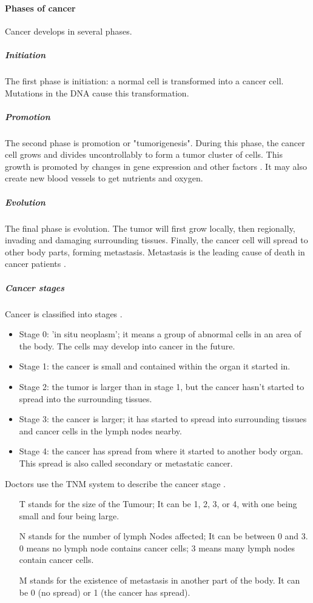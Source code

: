 \paragraph{Phases of cancer}
Cancer develops in several phases.
\subparagraph{Initiation}
The first phase is initiation: a normal cell is transformed into a cancer cell.
Mutations in the DNA cause this transformation.
\subparagraph{Promotion}
The second phase is promotion or "tumorigenesis".
During this phase, the cancer cell grows and divides uncontrollably to form a tumor cluster of cells.
This growth is promoted by changes in gene expression and other factors \cite{Witsch2010}.
It may also create new blood vessels to get nutrients and oxygen.
\subparagraph{Evolution}
The final phase is evolution.
The tumor will first grow locally, then regionally, invading and damaging surrounding tissues.
Finally, the cancer cell will spread to other body parts, forming metastasis.
Metastasis is the leading cause of death in cancer patients \cite{Steeg2006}.

\subparagraph{Cancer stages}
Cancer is classified into stages \cite{cancerresearchuk2023}.
\begin{itemize}
	\item Stage 0: 'in situ neoplasm'; it means a group of abnormal cells in an area of the body. The cells may develop into cancer in the future.
	\item Stage 1: the cancer is small and contained within the organ it started in.
	\item Stage 2: the tumor is larger than in stage 1, but the cancer hasn't started to spread into the surrounding tissues.
	\item Stage 3: the cancer is larger; it has started to spread into surrounding tissues and cancer cells in the lymph nodes nearby.
	\item Stage 4: the cancer has spread from where it started to another body organ. This spread is also called secondary or metastatic cancer.
\end{itemize}
Doctors use the TNM system to describe the cancer stage \cite{Brierley2016}.
\begin{itemize}
	\item [T] stands for the size of the Tumour;
	It can be 1, 2, 3, or 4, with one being small and four being large.
	\item [N] stands for the number of lymph Nodes affected;
	It can be between 0 and 3.
	0 means no lymph node contains cancer cells; 3 means many lymph nodes contain cancer cells.
	\item [M] stands for the existence of metastasis in another part of the body.
	It can be 0 (no spread) or 1 (the cancer has spread).
\end{itemize}


